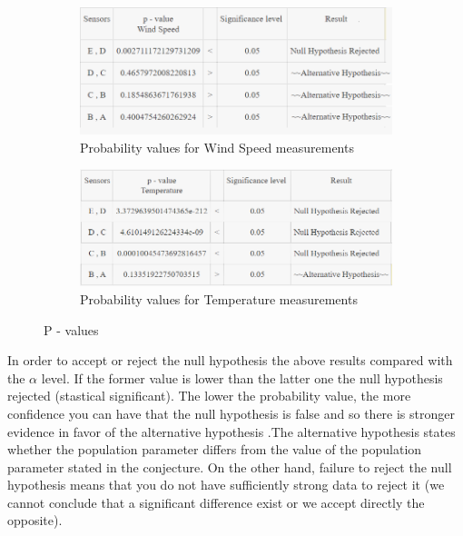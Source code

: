 \documentclass[a4paper]{article}
\begin{document}
            \begin{figure}[H]
            \centering
                    \begin{subfigure}[b]{0.4\linewidth}
                      \includegraphics[width=\linewidth]{images/p_value_ws.PNG}
                      \caption{Probability values for Wind Speed measurements}
                    \end{subfigure}
                    \begin{subfigure}[b]{0.4\linewidth}
                      \includegraphics[width=\linewidth]{images/p_value_t.PNG}
                      \caption{Probability values for Temperature measurements}
                    \end{subfigure}
                    \caption{P - values}
                    \label{fig:Histogram}
                \end{figure}

        In order to accept or reject the null hypothesis the above results compared with the $\alpha$ level. If the former value is lower than the latter one the null hypothesis rejected (stastical significant). The lower the probability value, the more confidence you can have that the null hypothesis is false and so there is stronger evidence in favor of the alternative hypothesis \cite{newtest}.The alternative hypothesis states whether the population parameter differs from the value of the population parameter stated in the conjecture. On the other hand, failure to reject the null hypothesis means that you do not have sufficiently strong data to reject it (we cannot conclude that a significant difference exist or we accept directly the opposite).
\end{document}
